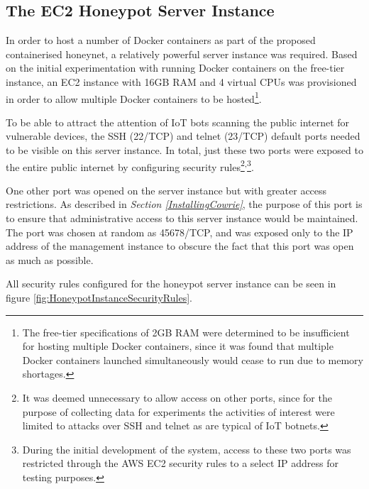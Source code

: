 \subsection{The EC2 Honeypot Server Instance}
	
	In order to host a number of Docker containers as part of the proposed containerised honeynet, a relatively powerful server instance was required. Based on the initial experimentation with running Docker containers on the free-tier instance, an EC2 instance with 16GB RAM and 4 virtual CPUs was provisioned in order to allow multiple Docker containers to be hosted\footnote{The free-tier specifications of 2GB RAM were determined to be insufficient for hosting multiple Docker containers, since it was found that multiple Docker containers launched simultaneously would cease to run due to memory shortages.}. 
	
    To be able to attract the attention of IoT bots scanning the public internet for vulnerable devices, the SSH (22/TCP) and telnet (23/TCP) default ports needed to be visible on this server instance. In total, just these two ports were exposed to the entire public internet by configuring security rules\footnote{It was deemed unnecessary to allow access on other ports, since for the purpose of collecting data for experiments the activities of interest were limited to attacks over SSH and telnet as are typical of IoT botnets.}\textsuperscript{,}\footnote{During the initial development of the system, access to these two ports was restricted through the AWS EC2 security rules to a select IP address for testing purposes.}. 
    
    One other port was opened on the server instance but with greater access restrictions. As described in \textit{Section \ref{InstallingCowrie}}, the purpose of this port is to ensure that administrative access to this server instance would be maintained. The port was chosen at random as 45678/TCP, and was exposed only to the IP address of the management instance to obscure the fact that this port was open as much as possible.
    
All security rules configured for the honeypot server instance can be seen in figure \ref{fig:HoneypotInstanceSecurityRules}.

